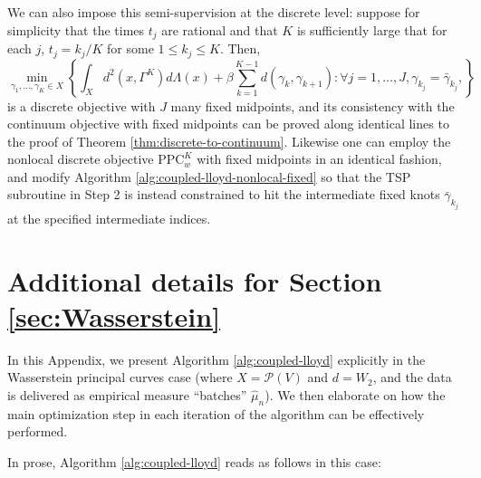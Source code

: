 \documentclass[aos, preprint]{imsart}
\theoremstyle{plain}
\theoremstyle{remark}
\begin{document}
\begin{appendix}
We can also impose this semi-supervision at the discrete level: suppose for simplicity that the times $t_j$ are rational and that $K$ is sufficiently large that for each $j$, $t_j=k_j/K$ for some $1\leq k_j \leq K$. Then,
\[
\min_{\gamma_{1},\ldots,\gamma_{K}\in X}\left\{ \int_{X}d^{2}(x,\Gamma^{K})d\Lambda(x)+\beta\sum_{k=1}^{K-1}d(\gamma_{k},\gamma_{k+1}):\forall j=1,\ldots,J,\gamma_{k_j}=\bar{\gamma}_{k_j},\right\}
\]
is a discrete objective with $J$ many fixed midpoints, and its consistency with the continuum objective with fixed midpoints can be proved along identical lines to the proof of Theorem \ref{thm:discrete-to-continuum}. Likewise one can employ the nonlocal discrete objective $\text{PPC}_w^K$ with fixed midpoints in an identical fashion, and modify Algorithm \ref{alg:coupled-lloyd-nonlocal-fixed} so that the TSP subroutine in Step 2 is instead constrained to hit the intermediate fixed knots $\bar{\gamma}_{k_j}$ at the specified intermediate indices.

\section{\texorpdfstring{Additional details for Section \ref{sec:Wasserstein}}{Additional details for Section 3}}
\label{appn:extra-Wasserstein}

In this Appendix, we present Algorithm \ref{alg:coupled-lloyd} explicitly in the Wasserstein principal curves case (where $X=\mathcal{P}(V)$ and $d=W_{2}$,
and the data is delivered as empirical measure ``batches'' $\hat{\mu}_{n}$). We then elaborate on how the main optimization step in each iteration of the algorithm can be effectively performed.

In prose, Algorithm \ref{alg:coupled-lloyd} reads as follows in this case:


\end{appendix}
\end{document}
